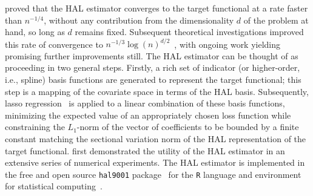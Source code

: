 \citet{vdl2015generally, vdl2017generally} proved that the HAL estimator
converges to the target functional at a rate faster than $n^{-1/4}$, without any
contribution from the dimensionality $d$ of the problem at hand, so long as $d$
remains fixed. Subsequent theoretical investigations improved this rate of
convergence to $n^{-1/3} \log(n)^{d/2}$~\citep{bibaut2019fast}, with ongoing
work yielding promising further improvements still. The HAL estimator can be
thought of as proceeding in two general steps. Firstly, a rich set of indicator
(or higher-order, i.e., spline) basis functions are generated to represent the
target functional; this step is a mapping of the covariate space in terms of the
HAL basis. Subsequently, lasso regression~\citep{tibshirani1996regression} is
applied to a linear combination of these basis functions, minimizing the
expected value of an appropriately chosen loss function while constraining the
$L_1$-norm of the vector of coefficients to be bounded by a finite constant
matching the sectional variation norm of the HAL representation of the target
functional. \citet{benkeser2016highly} first demonstrated the utility of the HAL
estimator in an extensive series of numerical experiments. The HAL estimator is
implemented in the free and open source \texttt{hal9001}
package~\citep{coyle2021hal9001, hejazi2020hal9001} for the \texttt{R}
language and environment for statistical computing~\citep{R}.

